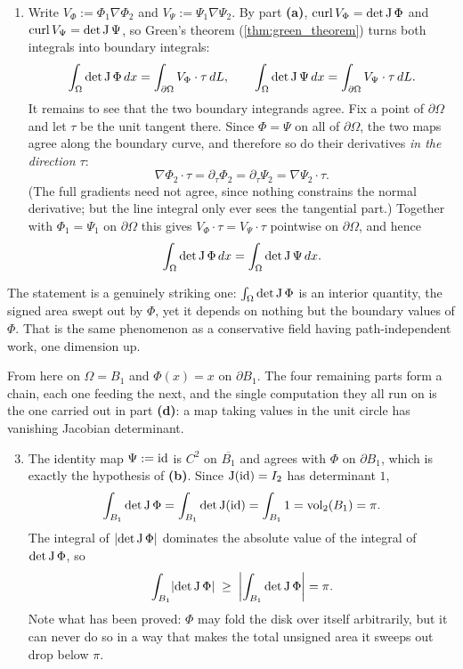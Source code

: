 \begin{exercisesolution}
\begin{enumerate}[label=\textbf{(\alph*)}]
  \item Write $V_\Phi := \Phi_1 \nabla \Phi_2$ and $V_\Psi := \Psi_1 \nabla \Psi_2$. By part
\textbf{(a)}, $\operatorname{curl} V_\Phi = \det \operatorname{J}\Phi$ and $\operatorname{curl} V_\Psi = \det \operatorname{J}\Psi$, so Green's theorem
(\cref{thm:green_theorem}) turns both integrals into boundary integrals:
\[\int_\Omega \det \operatorname{J}\Phi \, dx = \int_{\partial \Omega} V_\Phi \cdot \tau \, dL,
\qquad
\int_\Omega \det \operatorname{J}\Psi \, dx = \int_{\partial \Omega} V_\Psi \cdot \tau \, dL.\]
It remains to see that the two boundary integrands agree. Fix a point of $\partial\Omega$ and let
$\tau$ be the unit tangent there. Since $\Phi = \Psi$ on all of $\partial\Omega$, the two maps agree
along the boundary curve, and therefore so do their derivatives \emph{in the direction $\tau$}:
\[\nabla \Phi_2 \cdot \tau = \partial_\tau \Phi_2 = \partial_\tau \Psi_2 = \nabla \Psi_2 \cdot \tau .\]
(The full gradients need not agree, since nothing constrains the normal derivative; but the line
integral only ever sees the tangential part.) Together with $\Phi_1 = \Psi_1$ on $\partial\Omega$
this gives $V_\Phi \cdot \tau = V_\Psi \cdot \tau$ pointwise on $\partial\Omega$, and hence
\[\int_\Omega \det \operatorname{J}\Phi \, dx = \int_\Omega \det \operatorname{J}\Psi \, dx.\]
\end{enumerate}
\begin{remark}
The statement is a genuinely striking one: $\int_\Omega \det\operatorname{J}\Phi$ is an interior quantity, the
signed area swept out by $\Phi$, yet it depends on nothing but the boundary values of $\Phi$. That
is the same phenomenon as a conservative field having path-independent work, one dimension up.
\end{remark}

From here on $\Omega = B_1$ and $\Phi(x) = x$ on $\partial B_1$. The four remaining parts form a
chain, each one feeding the next, and the single computation they all run on is the one carried
out in part \textbf{(d)}: a map taking values in the unit circle has vanishing Jacobian
determinant.
\begin{enumerate}[label=\textbf{(\alph*)}]
  \setcounter{enumi}{2}
  \item The identity map $\Psi := \operatorname{id}$ is $C^2$ on $\overline{B_1}$ and agrees with $\Phi$ on
    $\partial B_1$, which is exactly the hypothesis of \textbf{(b)}. Since
    $\operatorname{J}(\operatorname{id}) = I_2$ has determinant $1$,
    \[\int_{B_1}\det\operatorname{J}\Phi = \int_{B_1}\det\operatorname{J}(\operatorname{id}) = \int_{B_1} 1 = \operatorname{vol}_2(B_1) = \pi .\]
    The integral of $\lvert\det\operatorname{J}\Phi\rvert$ dominates the absolute value of the integral of
    $\det\operatorname{J}\Phi$, so
    \[\int_{B_1}\lvert\det\operatorname{J}\Phi\rvert \;\geq\; \left\lvert\int_{B_1}\det\operatorname{J}\Phi\right\rvert
      = \pi .\]
    Note what has been proved: $\Phi$ may fold the disk over itself arbitrarily, but it can never
    do so in a way that makes the total unsigned area it sweeps out drop below $\pi$.


\end{enumerate}
\end{exercisesolution}
